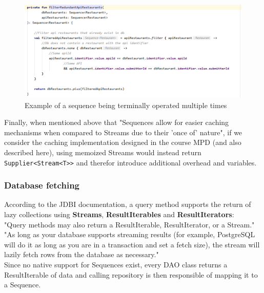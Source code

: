 \begin{figure}[H]
    \begin{center}
        \includegraphics[scale=0.6]{_figures/5.2.5-3.png}
        \caption{Example of a sequence being terminally operated multiple times}
    \end{center}
\end{figure}

Finally, when mentioned above that "Sequences allow for easier caching mechanisms when compared to Streams due to their 'once of' nature", if we consider the
caching implementation designed in the course MPD (and also described here\cite{replay-java-streams}), using memoized Streams would
instead return \texttt{Supplier<Stream<T>>} and therefor introduce additional overhead and variables.\\

\subsubsection{Database fetching}

According to the JDBI documentation\cite{jdbi}, a query method supports the return of lazy
collections using \textbf{Streams}, \textbf{ResultIterables} and \textbf{ResultIterators}:\\

"Query methods may also return a ResultIterable\cite{resultiterable}, ResultIterator\cite{resultiterator}, or a Stream\cite{streams}."\\

"As long as your database supports streaming results (for example, PostgreSQL will do it as long as you are in a transaction and set a fetch size), the
stream will lazily fetch rows from the database as necessary."\\

Since no native support for Sequences exist, every DAO class returns a ResultIterable of data and calling repository is then responsible of mapping it to
a Sequence.\\


